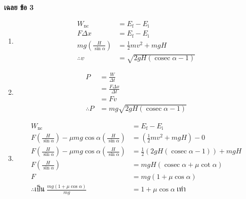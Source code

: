 \documentclass[a4paper,12pt]{article}
\DeclareMathOperator{\cosec}{cosec}
\begin{document}
\newpage
\begin{center}
	\textbf{{\Large เฉลย ข้อ 3}}
\end{center}
\begin{enumerate}
	\item \begin{align*}
		      W_{\text{nc}}                       & =E_\text{f}-E_\text{i}       \\
		      F\Delta x                           & =E_\text{f}-E_\text{i}       \\
		      mg\left(\frac{H}{\sin\alpha}\right) & =\frac{1}{2}mv^2+mgH         \\
		      \therefore v                        & =\sqrt{2gH(\cosec \alpha-1)}
	      \end{align*}
	\item \begin{align*}
		      P            & =\frac{W}{\Delta t}            \\
		                   & =\frac{F\Delta x}{\Delta t}    \\
		                   & =Fv                            \\
		      \therefore P & =mg\sqrt{2gH(\cosec \alpha-1)}
	      \end{align*}
	\item \begin{align*}
		      W_{\text{nc}}                                                                           & =E_\text{f}-E_\text{i}                 \\
		      F\left( \frac{H}{\sin\alpha}\right) -\mu mg\cos\alpha\left( \frac{H}{\sin\alpha}\right) & =\left( \frac{1}{2}mv^2+mgH\right) -0  \\
		      F\left( \frac{H}{\sin\alpha}\right) -\mu mg\cos\alpha\left( \frac{H}{\sin\alpha}\right) & =\frac{1}{2}(2gH(\cosec \alpha-1))+mgH \\
		      F\left( \frac{H}{\sin\alpha}\right)                                                     & =mgH(\cosec\alpha+\mu\cot\alpha)       \\
		      F                                                                                       & =mg(1+\mu\cos\alpha)                   \\
		      \therefore \text{เป็น} \;\frac{mg(1+\mu\cos\alpha)}{mg}                                  & =1+\mu\cos\alpha\; \text{เท่า}
	      \end{align*}
\end{enumerate}
\end{document}
